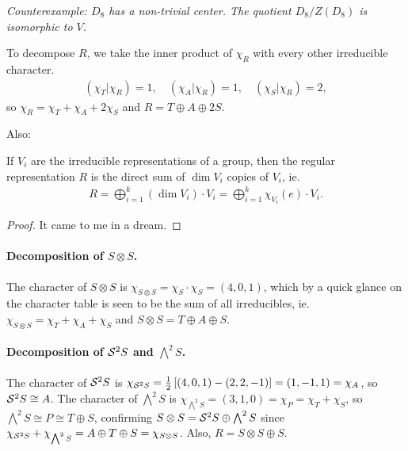 \textit{Counterexample: $D_8$ has a non-trivial center. The quotient $D_8/Z(D_8)$ is isomorphic to $V$.} 

To decompose $R$, we take the inner product of $\chi_R$ with every other irreducible character.
\begin{align}
	({\chi_T}|{\chi_R}) = 1, \quad
	({\chi_A}|{\chi_R})= 1, \quad
	({\chi_S}|{\chi_R}) = 2, 
\end{align}
so $\chi_R = \chi_T + \chi_A + 2\chi_S$ and $R = T \oplus A \oplus 2S$.

Also:
\begin{theorem}
	If $V_i$ are the irreducible representations of a group, then the regular representation $R$ is the direct sum of $\dim V_i$ copies of $V_i$, ie. 
	\begin{align}
		R = \bigoplus_{i=1}^{k} (\dim V_i) \cdot V_i = \bigoplus_{i=1}^{k} \chi_{V_i}(e) \cdot V_i .
	\end{align}
\end{theorem}
\begin{proof}
	It came to me in a dream. %
\end{proof}

\paragraph{Decomposition of $S \otimes S$.} The character of $S \otimes S$ is $\chi_{S \otimes S} = \chi_S \cdot \chi_S = (4,0,1)$, which by a quick glance on the character table is seen to be the sum of all irreducibles, ie. $\chi_{S \otimes S} = \chi_T + \chi_A + \chi_S$ and $S \otimes S = T \oplus A \oplus S$.

\paragraph{Decomposition of $\mathcal{S}^2S$ and $\bigwedge^2S$.} The character of $\mathcal{S}^2S$ is $\chi_{\mathcal{S}^2S} = \frac{1}{2}\left[ (4,0,1) - (2,2,-1) \right] = (1,-1,1) = \chi_A$, so $\mathcal{S}^2S \cong A$. The character of $\bigwedge^2S$ is $\chi_{\bigwedge^2S} = (3,1,0) = \chi_P = \chi_T + \chi_S$, so $\bigwedge^2S \cong P \cong T \oplus S$, confirming $S \otimes S = \mathcal{S}^2S \oplus \bigwedge^2S$ since $\chi_{\mathcal{S}^2S} + \chi_{\bigwedge^2S} = A \oplus T \oplus S = \chi_{S \otimes S}$. Also, $R = S \otimes S \oplus S$.

